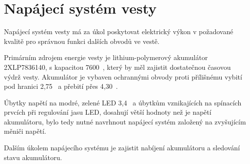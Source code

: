 \chapter{Napájecí systém vesty}
Napájecí systém vesty má za úkol poskytovat elektrický výkon v požadované kvalitě pro správnou funkci dalších obvodů ve vestě.

Primárním zdrojem energie vesty je lithium-polymerový akumulátor 2XLP7836140, s kapacitou 7600~, který by měl zajistit dostatečnou časovou výdrž vesty. Akumulátor je vybaven ochrannými obvody proti přílišnému vybití pod hranici 2,75~ a přebití přes 4,30~.

Úbytky napětí na modré, zelené LED 3,4~ a úbytkům vznikajících na spínacích prvcích při regulování jasu LED, dosahují větší hodnoty než je napětí akumulátoru, bylo tedy nutné navrhnout napájecí systém založený na zvyšujícím měniči napětí.

Dalším úkolem napájecího systému je zajistit nabíjení akumulátoru a sledování stavu akumulátoru.

